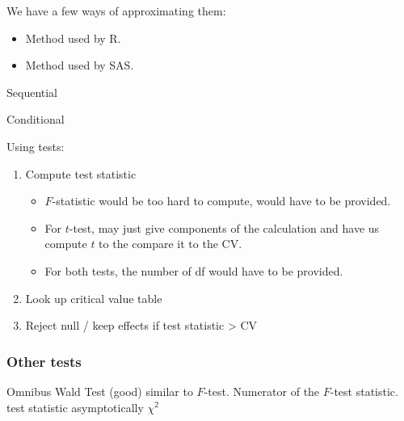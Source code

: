 \documentclass[english]{article}
\begin{document}
\begin{multicols*}{2}
\begin{definitionNOHFILL}[$F$-test]
We have a few ways of approximating them:

\begin{definitionNOHFILLpropos}[Scatterwhite]

\begin{itemize}
	\item	Method used by R.
\end{itemize}
\end{definitionNOHFILLpropos}

\begin{definitionNOHFILLpropos}

\begin{itemize}
	\item	Method used by SAS.
\end{itemize}
\end{definitionNOHFILLpropos}

\begin{definitionNOHFILLsub}[Type $I$]
Sequential
\end{definitionNOHFILLsub}

\begin{definitionNOHFILLsub}
Conditional
\end{definitionNOHFILLsub}
\end{definitionNOHFILL}


Using tests:
\begin{enumerate}
	\item	Compute test statistic
		\begin{itemize}
		\item	$F$-statistic would be too hard to compute, would have to be provided.
		\item	For $t$-test, may just give components of the calculation and have us compute $t$ to the compare it to the CV.
		\item	For both tests, the number of df would have to be provided.
		\end{itemize}
	\item	Look up critical value table
	\item	Reject null / keep effects if test statistic > CV
\end{enumerate}

\subsubsection{Other tests}
Omnibus Wald Test (good)
	similar to $F$-test.
	Numerator of the $F$-test statistic.
	test statistic asymptotically $\chi^{2}$


\end{multicols*}
\end{document}
